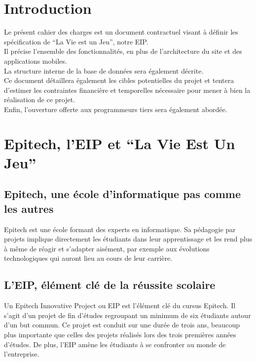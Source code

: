 \documentclass{life-fr}
\begin{document}
\chapter{Introduction}

Le présent cahier des charges est un document contractuel visant à définir les
spécification de ``La Vie est un Jeu'', notre EIP.\\
Il précise l’ensemble des fonctionnalités, en plus de l’architecture du site et
des applications mobiles.\\
La structure interne de la base de données sera également décrite.\\
Ce document détaillera également les cibles potentielles du projet et tentera
d’estimer les contraintes financière et temporelles nécessaire pour mener à bien
la réalisation de ce projet.\\
Enfin, l’ouverture offerte aux programmeurs tiers sera également abordée.



\chapter{Epitech, l'EIP et ``La Vie Est Un Jeu''}

\section{Epitech, une école d'informatique pas comme les autres}

Epitech est une école formant des experts en informatique. Sa pédagogie par projets
implique directement les étudiants dans leur apprentissage et les rend plus à même
de réagir et s'adapter aisément, par exemple aux évolutions technologiques qui
auront lieu au cours de leur carrière.

\section{L'EIP, élément clé de la réussite scolaire}

Un Epitech Innovative Project ou EIP est l'élément clé du cursus Epitech. Il s'agit d'un projet de fin d'études regroupant un minimum de six étudiants autour d'un but commun. Ce projet est conduit sur une durée de trois ans, beaucoup plus importante que celles des projets réalisés lors des trois premières années d'études. De plus, l'EIP amène les étudiants à se confronter au monde de l'entreprise.
\end{document}
